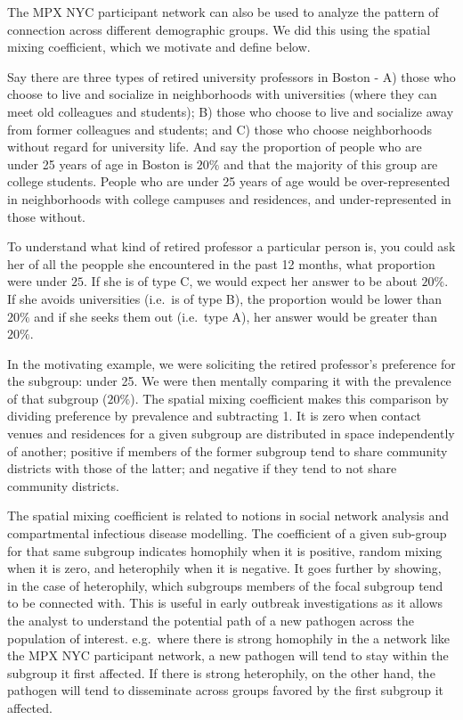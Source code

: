 \documentclass[
  letterpaper,
  DIV=11,
  numbers=noendperiod,
  oneside]{scrreprt}
\begin{document}
The MPX NYC participant network can also be used to analyze the pattern
of connection across different demographic groups. We did this using the
spatial mixing coefficient, which we motivate and define below.

Say there are three types of retired university professors in Boston -
A) those who choose to live and socialize in neighborhoods with
universities (where they can meet old colleagues and students); B) those
who choose to live and socialize away from former colleagues and
students; and C) those who choose neighborhoods without regard for
university life. And say the proportion of people who are under 25 years
of age in Boston is \(20\%\) and that the majority of this group are
college students. People who are under 25 years of age would be
over-represented in neighborhoods with college campuses and residences,
and under-represented in those without.

To understand what kind of retired professor a particular person is, you
could ask her of all the peopple she encountered in the past 12 months,
what proportion were under \(25\). If she is of type C, we would expect
her answer to be about \(20\%\). If she avoids universities (i.e.~is of
type B), the proportion would be lower than \(20\%\) and if she seeks
them out (i.e.~type A), her answer would be greater than \(20\%\).

In the motivating example, we were soliciting the retired professor's
preference for the subgroup: under 25. We were then mentally comparing
it with the prevalence of that subgroup (\(20\%\)). The spatial mixing
coefficient makes this comparison by dividing preference by prevalence
and subtracting 1. It is zero when contact venues and residences for a
given subgroup are distributed in space independently of another;
positive if members of the former subgroup tend to share community
districts with those of the latter; and negative if they tend to not
share community districts.

The spatial mixing coefficient is related to notions in social network
analysis and compartmental infectious disease modelling. The coefficient
of a given sub-group for that same subgroup indicates homophily when it
is positive, random mixing when it is zero, and heterophily when it is
negative. It goes further by showing, in the case of heterophily, which
subgroups members of the focal subgroup tend to be connected with. This
is useful in early outbreak investigations as it allows the analyst to
understand the potential path of a new pathogen across the population of
interest. e.g.~where there is strong homophily in the a network like the
MPX NYC participant network, a new pathogen will tend to stay within the
subgroup it first affected. If there is strong heterophily, on the other
hand, the pathogen will tend to disseminate across groups favored by the
first subgroup it affected.
\end{document}
